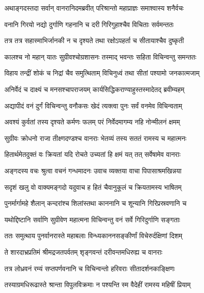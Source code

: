 
\twolineshloka
{अथाङ्गदस्तदा सर्वान् वानरानिदमब्रवीत्}
{परिश्रान्तो महाप्राज्ञः समाश्वास्य शनैर्वचः} %

\twolineshloka
{वनानि गिरयो नद्यो दुर्गाणि गहनानि च}
{दरी गिरिगुहाश्चैव विचिताः सर्वमन्ततः} %

\twolineshloka
{तत्र तत्र सहास्माभिर्जानकी न च दृश्यते}
{तथा रक्षोऽपहर्ता च सीतायाश्चैव दुष्कृती} %

\twolineshloka
{कालश्च नो महान् यातः सुग्रीवश्चोग्रशासनः}
{तस्माद् भवन्तः सहिता विचिन्वन्तु समन्ततः} %

\twolineshloka
{विहाय तन्द्रीं शोकं च निद्रां चैव समुत्थिताम्}
{विचिनुध्वं तथा सीतां पश्यामो जनकात्मजाम्} %

\twolineshloka
{अनिर्वेदं च दाक्ष्यं च मनसश्चापराजयम्}
{कार्यसिद्धिकराण्याहुस्तस्मादेतद् ब्रवीम्यहम्} %

\twolineshloka
{अद्यापीदं वनं दुर्गं विचिन्वन्तु वनौकसः}
{खेदं त्यक्त्वा पुनः सर्वं वनमेव विचिन्वताम्} %

\twolineshloka
{अवश्यं कुर्वतां तस्य दृश्यते कर्मणः फलम्}
{परं निर्वेदमागम्य नहि नोन्मीलनं क्षमम्} %

\twolineshloka
{सुग्रीवः क्रोधनो राजा तीक्ष्णदण्डश्च वानराः}
{भेतव्यं तस्य सततं रामस्य च महात्मनः} %

\twolineshloka
{हितार्थमेतदुक्तं वः क्रियतां यदि रोचते}
{उच्यतां हि क्षमं यत् तत् सर्वेषामेव वानराः} %

\twolineshloka
{अङ्गदस्य वचः श्रुत्वा वचनं गन्धमादनः}
{उवाच व्यक्तया वाचा पिपासाश्रमखिन्नया} %

\twolineshloka
{सदृशं खलु वो वाक्यमङ्गदो यदुवाच ह}
{हितं चैवानुकूलं च क्रियतामस्य भाषितम्} %

\twolineshloka
{पुनर्मार्गामहे शैलान् कन्दरांश्च शिलांस्तथा}
{काननानि च शून्यानि गिरिप्रस्रवणानि च} %

\twolineshloka
{यथोद्दिष्टानि सर्वाणि सुग्रीवेण महात्मना}
{विचिन्वन्तु वनं सर्वे गिरिदुर्गाणि सङ्गताः} %

\twolineshloka
{ततः समुत्थाय पुनर्वानरास्ते महाबलाः}
{विन्ध्यकाननसङ्कीर्णां विचेरुर्दक्षिणां दिशम्} %

\twolineshloka
{ते शारदाभ्रप्रतिमं श्रीमद्रजतपर्वतम्}
{शृङ्गवन्तं दरीवन्तमधिरुह्य च वानराः} %

\twolineshloka
{तत्र लोध्रवनं रम्यं सप्तपर्णवनानि च}
{विचिन्वन्तो हरिवराः सीतादर्शनकाङ्क्षिणः} %

\twolineshloka
{तस्याग्रमधिरूढास्ते श्रान्ता विपुलविक्रमाः}
{न पश्यन्ति स्म वैदेहीं रामस्य महिषीं प्रियाम्} %

